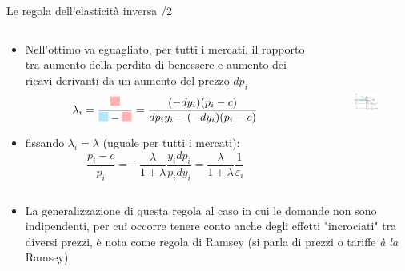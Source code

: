 \documentclass[aspectratio=149,11pt]{beamer}
\begin{document}
\begin{frame}{Le regola dell'elasticità inversa /2}
\begin{columns}
\begin{column}{.57\columnwidth}
\begin{itemize}
\item Nell'ottimo va eguagliato, per tutti i mercati, il rapporto tra aumento della perdita di benessere e aumento dei ricavi derivanti da un aumento del prezzo $dp_i$
\begin{equation*}
  \lambda_i=
  \frac{\textcolor{red!30!white}{\rule{3mm}{3mm}}}{\textcolor{cyan!30!white}{\rule{3mm}{3mm}}-
        \textcolor{red!30!white}{\rule{3mm}{3mm}}}=
  \frac{(-dy_i)(p_i-c)}{dp_iy_i-(-dy_i)(p_i-c)}
\end{equation*}
\item fissando $\lambda_i=\lambda$ (uguale per tutti i mercati):
\begin{equation*}
   \frac{p_i-c}{p_i} = -\frac{\lambda}{1+\lambda}\frac{y_idp_i}{p_idy_i} = \frac{\lambda}{1+\lambda}\frac{1}{\varepsilon_i} 
\end{equation*}
\end{itemize}
\end{column}

\begin{column}{.43\columnwidth}
\begin{figure}[htbp]
\centering
\includegraphics[height=4cm]{./figure/ramsey-4-color.pdf}
\end{figure}
\end{column}
\end{columns}

\medskip
\begin{itemize}
\item La generalizzazione di questa regola al caso in cui le domande non sono
indipendenti, per cui occorre tenere conto anche degli effetti "incrociati" tra diversi prezzi, è nota come \alert{regola di Ramsey} (si parla di prezzi o tariffe \emph{à la} Ramsey)
\end{itemize}
\end{frame}
\end{document}
